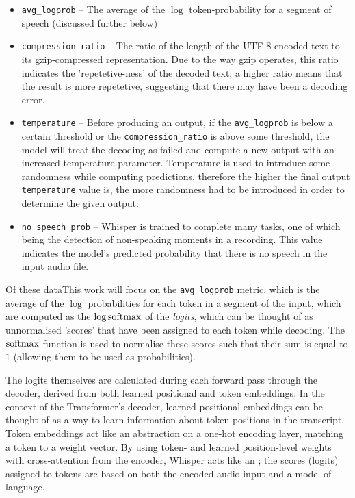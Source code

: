\begin{itemize}
  \item \texttt{avg\_logprob} -- The average of the $\log$ token-probability for a segment of speech (discussed further below)
  \item \texttt{compression\_ratio} -- The ratio of the length of the UTF-8-encoded text to its gzip-compressed representation.
    Due to the way gzip operates, this ratio indicates the 'repetetive-ness' of the decoded text; a higher ratio means that the result is more repetetive, suggesting that there may have been a decoding error.
  \item \texttt{temperature} -- Before producing an output, if the \texttt{avg\_logprob} is below a certain threshold or the \texttt{compression\_ratio} is above some threshold, the model will treat the decoding as failed and compute a new output with an increased temperature parameter.
    Temperature is used to introduce some randomness while computing predictions, therefore the higher the final output \texttt{temperature} value is, the more randomness had to be introduced in order to determine the given output.
  \item \texttt{no\_speech\_prob} -- Whisper is trained to complete many tasks, one of which being the detection of non-speaking moments in a recording.
    This value indicates the model's predicted probability that there is no speech in the input audio file.
\end{itemize}

Of these dataThis work will focus on the \texttt{avg\_logprob} metric, which is the average of the $\log$ probabilities for each token in a segment of the input, which are computed as the $\log \operatorname{softmax}$ of the \emph{logits}, which can be thought of as unnormalised 'scores' that have been assigned to each token while decoding.
The $\operatorname{softmax}$ function is used to normalise these scores such that their sum is equal to $1$ (allowing them to be used as probabilities).

The logits themselves are calculated during each forward pass through the decoder, derived from both learned positional and token embeddings.
In the context of the Transformer's decoder, learned positional embeddings can be thought of as a way to learn information about token positions in the transcript\cite{wang2020position}.
Token embeddings act like an abstraction on a one-hot encoding layer, matching a token to a weight vector.
By using token- and learned position-level weights with cross-attention from the encoder\cite{vaswani2017attention}, Whisper acts like an \cite{whisper}; the scores (logits) assigned to tokens are based on both the encoded audio input and a model of language.

